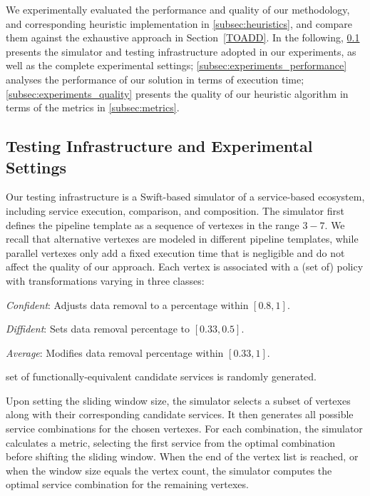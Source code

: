 We experimentally evaluated the performance and quality of our methodology, and corresponding heuristic implementation in \cref{subsec:heuristics},
and compare them against the exhaustive approach in Section~\ref{TOADD}. In the following,
\cref{subsec:experiments_infrastructure} presents the simulator and testing infrastructure adopted in our experiments, as well as the complete experimental settings; \cref{subsec:experiments_performance} analyses the performance of our solution in terms of execution time; \cref{subsec:experiments_quality} presents the quality of our heuristic algorithm in terms of the metrics in \cref{subsec:metrics}.

\subsection{Testing Infrastructure and Experimental Settings}\label{subsec:experiments_infrastructure}
Our testing infrastructure is a Swift-based simulator of a service-based ecosystem, including service execution, comparison, and composition.
The simulator first defines the pipeline template as a sequence of vertexes in the range $3-7$.
We recall that alternative vertexes are modeled in different pipeline templates,
while parallel vertexes only add a fixed execution time that is negligible and do not affect the quality of our approach.
Each vertex is associated with a (set of) policy with transformations varying in three classes:

\begin{itemize*}[label=roman*]
  \item \textit{Confident}: Adjusts data removal to a percentage within $[0.8,1]$.
  \item \textit{Diffident}: Sets data removal percentage to $[0.33,0.5]$.
  \item \textit{Average}: Modifies data removal percentage within $[0.33,1]$.
\end{itemize*}
set of functionally-equivalent candidate services is randomly generated.

Upon setting the sliding window size, the simulator selects a subset of vertexes along with their corresponding candidate services.
It then generates all possible service combinations for the chosen vertexes.
For each combination, the simulator calculates a metric, selecting the first service from the optimal combination before shifting the sliding window.
When the end of the vertex list is reached, or when the window size equals the vertex count, the simulator computes the optimal service combination for the remaining vertexes.

